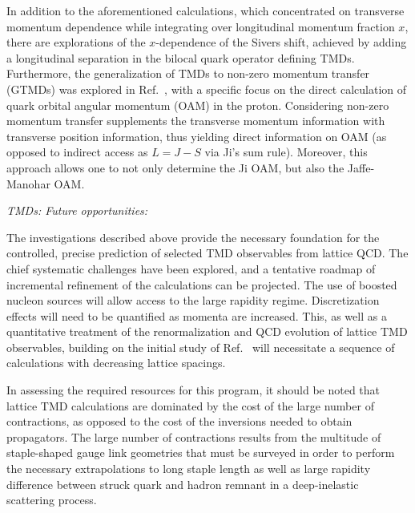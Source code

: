 In addition to the aforementioned calculations, which concentrated on
transverse momentum dependence while integrating over longitudinal
momentum fraction $x$, there are explorations of the
$x$-dependence of the Sivers shift, achieved by adding a
longitudinal separation in the bilocal quark operator defining TMDs.
Furthermore, the generalization
of TMDs to non-zero momentum transfer (GTMDs) was explored in
Ref.~\cite{Engelhardt:2017miy}, with a specific focus on the direct
calculation of quark orbital angular momentum (OAM) in the proton.
Considering non-zero momentum transfer supplements the transverse
momentum information with transverse position information, thus
yielding direct information on OAM (as opposed to indirect access
as $L=J-S$ via Ji's sum rule). Moreover, this approach allows one
to not only determine the Ji OAM, but also the Jaffe-Manohar OAM.

{\it TMDs: Future opportunities:}

The investigations described above provide the necessary foundation for
the controlled, precise prediction of selected TMD observables from
lattice QCD. The chief systematic challenges have been explored,
and a tentative roadmap of incremental refinement of the calculations can
be projected. The use of boosted nucleon sources will allow access to the large
rapidity regime. Discretization effects will need to be quantified
as momenta are increased. This, as well as a quantitative treatment
of the renormalization and QCD evolution of lattice TMD observables,
building on the initial study of Ref.~\cite{Yoon:2017qzo} will necessitate a
sequence of calculations with decreasing lattice spacings.

In assessing the required resources for this program, it should be noted that lattice
TMD calculations are dominated by the cost of the large number of
contractions, as opposed to the cost of the inversions needed to
obtain propagators. The large number of contractions results from the multitude of
staple-shaped gauge link geometries that must be surveyed in order
to perform the necessary extrapolations to long staple length as
well as large rapidity difference between struck quark and hadron
remnant in a deep-inelastic scattering process. 

